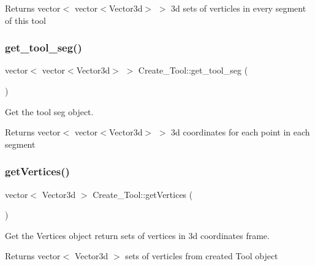 \begin{DoxyReturn}{Returns}
vector$<$ vector$<$\+Vector3d$>$ $>$ 3d sets of verticles in every segment of this tool 
\end{DoxyReturn}
\mbox{\label{classCreate__Tool_a328623ee81b8c11ea9e4dbe8bf863392}} 
\subsubsection{\texorpdfstring{get\+\_\+tool\+\_\+seg()}{get\_tool\_seg()}}
{\footnotesize\ttfamily vector$<$ vector$<$Vector3d$>$ $>$ Create\+\_\+\+Tool\+::get\+\_\+tool\+\_\+seg (\begin{DoxyParamCaption}{ }\end{DoxyParamCaption})\hspace{0.3cm}{\ttfamily [inline]}}



Get the tool seg object. 

\begin{DoxyReturn}{Returns}
vector$<$ vector$<$\+Vector3d$>$ $>$ 3d coordinates for each point in each segment 
\end{DoxyReturn}
\mbox{\label{classCreate__Tool_a1393c24c8f96f4e1b41d73db18b720c3}} 
\subsubsection{\texorpdfstring{get\+Vertices()}{getVertices()}}
{\footnotesize\ttfamily vector$<$ Vector3d $>$ Create\+\_\+\+Tool\+::get\+Vertices (\begin{DoxyParamCaption}{ }\end{DoxyParamCaption})\hspace{0.3cm}{\ttfamily [inline]}}



Get the Vertices object return sets of vertices in 3d coordinates frame. 

\begin{DoxyReturn}{Returns}
vector$<$ Vector3d $>$ sets of verticles from created \textquotesingle{}Tool\textquotesingle{} object 
\end{DoxyReturn}
\mbox{\label{classCreate__Tool_a419350e8721927d095385aa6bef0bc4b}} 
